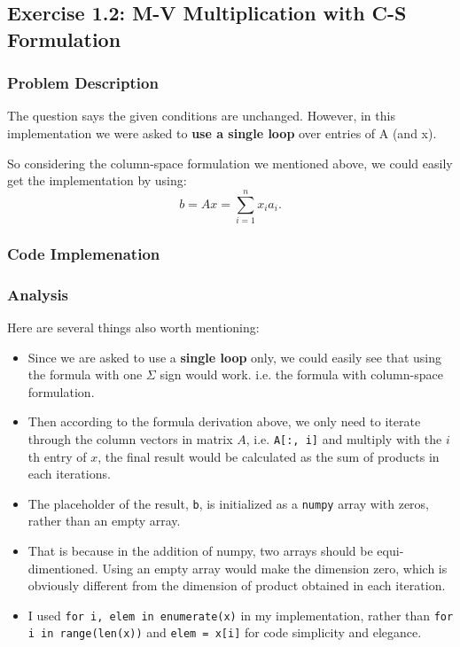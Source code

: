 \subsection*{Exercise 1.2: M-V Multiplication with C-S Formulation}%
\subsubsection*{Problem Description}
The question says the given conditions are unchanged. However, in this implementation we were asked to \textbf{use a single loop} over entries of A (and x).

\medskip
\noindent So considering the column-space formulation we mentioned above, we could easily get the implementation by using:
\[
b = Ax =  \sum_{i=1}^{n} x_i a_i
.\]

\subsubsection*{Code Implemenation}

\subsubsection*{Analysis} 
Here are several things also worth mentioning:
\begin{itemize}
\item Since we are asked to use a \textbf{single loop} only, we could easily see that using the formula with one $\Sigma$ sign would work. i.e. the formula with column-space formulation.
\item Then according to the formula derivation above, we only need to iterate through the column vectors in matrix $A$, i.e. \texttt{A[:, i]} and multiply with the $i$th entry of $x$, the final result would be calculated as the sum of products in each iterations.
\item The placeholder of the result, \texttt{b}, is initialized as a \texttt{numpy} array with zeros, rather than an empty array. 
\item That is because in the addition of numpy, two arrays should be equi-dimentioned. Using an empty array would make the dimension zero, which is obviously different from the dimension of product obtained in each iteration.
\item I used \texttt{for i, elem in enumerate(x)} in my implementation, rather than \texttt{for i in range(len(x))} and \texttt{elem = x[i]} for code simplicity and elegance.
\end{itemize}
